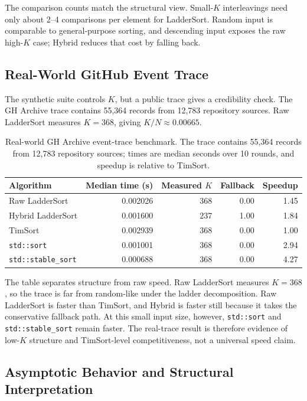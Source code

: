 \documentclass[10pt]{article}
\begin{document}
The comparison counts match the structural view. Small-\(K\) interleavings need only about 2--4 comparisons per element for LadderSort. Random input is comparable to general-purpose sorting, and descending input exposes the raw high-\(K\) case; Hybrid reduces that cost by falling back.

\subsection{Real-World GitHub Event Trace}
\label{real-world-github-event-trace}

The synthetic suite controls \(K\), but a public trace gives a credibility check. The GH Archive trace contains 55,364 records from 12,783 repository sources. Raw LadderSort measures \(K=368\), giving \(K/N\approx 0.00665\).

\begin{table}[H]
\centering
\scriptsize
\caption{Real-world GH Archive event-trace benchmark. The trace contains 55,364 records from 12,783 repository sources; times are median seconds over 10 rounds, and speedup is relative to TimSort.}
\label{tab:phase6-real-trace}
\begin{tabular}{@{}lrrrr@{}}
\toprule
Algorithm & Median time (s) & Measured \(K\) & Fallback & Speedup \\
\midrule
Raw LadderSort & 0.002026 & 368 & 0.00 & 1.45 \\
Hybrid LadderSort & 0.001600 & 237 & 1.00 & 1.84 \\
TimSort & 0.002939 & 368 & 0.00 & 1.00 \\
\texttt{std::sort} & 0.001001 & 368 & 0.00 & 2.94 \\
\texttt{std::stable\_sort} & 0.000688 & 368 & 0.00 & 4.27 \\
\bottomrule
\end{tabular}
\end{table}

The table separates structure from raw speed. Raw LadderSort measures \(K=368\), so the trace is far from random-like under the ladder decomposition. Raw LadderSort is faster than TimSort, and Hybrid is faster still because it takes the conservative fallback path. At this small input size, however, \texttt{std::sort} and \texttt{std::stable\_sort} remain faster. The real-trace result is therefore evidence of low-\(K\) structure and TimSort-level competitiveness, not a universal speed claim.

\subsection{\texorpdfstring{\textbf{Asymptotic Behavior and Structural Interpretation}}{Asymptotic Behavior and Structural Interpretation}}\label{asymptotic-behavior-and-structural-interpretation}
\end{document}
